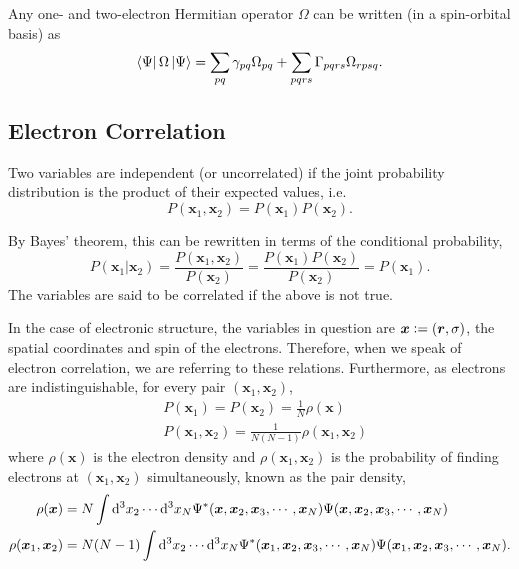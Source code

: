 Any one- and two-electron Hermitian operator $\Omega$ can be written (in a spin-orbital basis) as
\begin{equation}
    \label{eq:rdm-expectation}
    \bra{\Psi}\Omega\ket{\Psi} = \sum_{pq} \gamma_{pq}\Omega_{pq} + \sum_{pqrs} \Gamma_{pqrs}\Omega_{rpsq}.
\end{equation}

\subsection{Electron Correlation}
\label{sec:correlation}

Two variables are independent (or uncorrelated) if the joint probability distribution is the product of their expected values, i.e.
\begin{equation}
    P(\bm x_1, \bm x_2) = P(\bm x_1)P(\bm x_2).
\end{equation}

By Bayes' theorem,\cite{hastieElements2009,bayesLII1997} this can be rewritten in terms of the conditional probability,
\begin{equation}
    P(\bm x_1|\bm x_2) = \frac{P(\bm x_1, \bm x_2)}{P(\bm x_2)} = \frac{P(\bm x_1)P(\bm x_2)}{P(\bm x_2)} = P(\bm x_1).
\end{equation}
The variables are said to be correlated if the above is not true.

In the case of electronic structure, the variables in question are $\bm x \mathrel{\mathop:}= (\bm r, \sigma)$, the spatial coordinates and spin of the electrons. Therefore, when we speak of electron correlation, we are referring to these relations. Furthermore, as electrons are indistinguishable, for every pair $(\bm x_1, \bm x_2)$,
\begin{align}
    &P(\bm x_1) = P(\bm x_2) = \frac 1N \rho(\bm x) \\
    &P(\bm x_1, \bm x_2) = \frac 1{N(N-1)} \rho(\bm x_1, \bm x_2)
\end{align}
where $\rho(\bm x)$ is the electron density and $\rho(\bm x_1, \bm x_2)$ is the probability of finding electrons at $(\bm x_1, \bm x_2)$ simultaneously, known as the pair density,
\begin{align}
    \rho(\bm x) &= N\int \mathrm{d}^3x_2 \cdots \mathrm{d}^3x_N \Psi^*(\bm x, \bm x_2, \bm x_3, \cdots, \bm x_N)\Psi(\bm x, \bm x_2, \bm x_3, \cdots, \bm x_N) \\
    \rho(\bm x_1, \bm x_2) &= N(N-1)\int \mathrm{d}^3x_2 \cdots \mathrm{d}^3x_N \Psi^*(\bm x_1, \bm x_2, \bm x_3, \cdots, \bm x_N)\Psi(\bm x_1, \bm x_2, \bm x_3, \cdots, \bm x_N).
\end{align}

